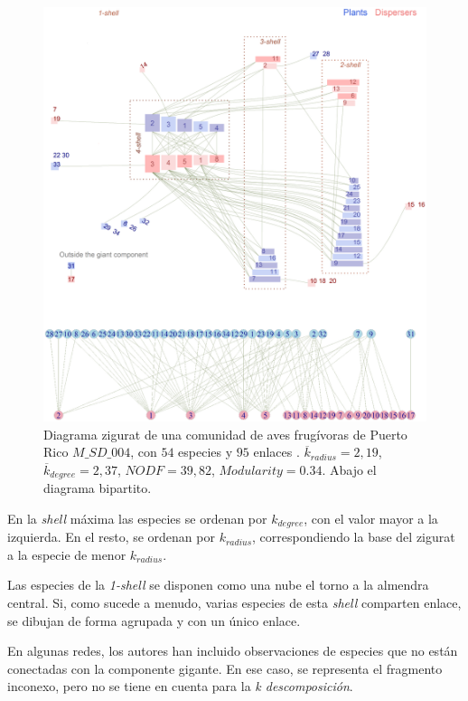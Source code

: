\begin{figure}[h!]
\centering
\includegraphics[scale=0.45]{Figures/VIS_ALL_SD_004.eps}
\caption {Diagrama zigurat de una comunidad de aves frugívoras de Puerto Rico  $M\_SD\_004$, con $54$ especies y $95$ enlaces \cite{carlo2003avian}. $\overline k_{radius} = 2,19$, $\overline k_{degree} = 2,37$, $NODF = 39,82$, $Modularity = 0.34$. Abajo el diagrama bipartito.}
\label{fig:ziggurat}
\end{figure}

En la \textit{shell} máxima las especies se ordenan por $k_{degree}$, con el valor mayor a la izquierda. En el resto, se ordenan por $k_{radius}$, correspondiendo la base del zigurat a la especie de menor $k_{radius}$.

Las especies de la \textit{1-shell} se disponen como una nube el torno a la almendra central. Si, como sucede a menudo, varias especies de esta \textit{shell} comparten enlace, se dibujan de forma agrupada y con un único enlace.

En algunas redes, los autores han incluido observaciones de especies que no están conectadas con la componente gigante. En ese caso, se representa el fragmento inconexo, pero no se tiene en cuenta para la \textit{k descomposición}.

